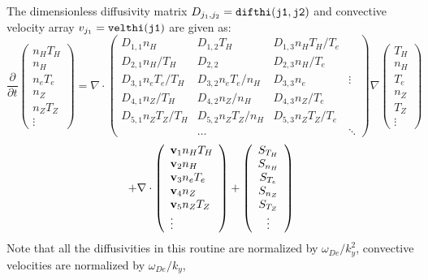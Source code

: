 The dimensionless diffusivity matrix $ D_{j_1,j_2} = {\tt difthi(j1,j2)}$
and convective velocity array $ v_{j_1} = {\tt velthi(j1)} $
are given as:
$$ \frac{\partial}{\partial t}
 \left( \begin{array}{c} n_H T_H  \\ n_H \\ n_e T_e \\
    n_Z \\ n_Z T_Z \\ \vdots
    \end{array} \right)
 = \nabla \cdot
\left( \begin{array}{llll}
D_{1,1} n_H & D_{1,2} T_H & D_{1,3} n_H T_H / T_e \\
D_{2,1} n_H / T_H & D_{2,2} & D_{2,3} n_H / T_e \\
D_{3,1} n_e T_e / T_H & D_{3,2} n_e T_e / n_H & D_{3,3} n_e & \vdots \\
D_{4,1} n_Z / T_H & D_{4,2} n_Z / n_H & D_{4,3} n_Z / T_e \\
D_{5,1} n_Z T_Z / T_H & D_{5,2} n_Z T_Z / n_H &
        D_{5,3} n_Z T_Z / T_e \\
 & \ldots & & \ddots
\end{array} \right)
 \nabla
 \left( \begin{array}{c}  T_H \\ n_H \\  T_e \\
   n_Z \\  T_Z \\ \vdots
    \end{array} \right)
$$
$$
 + \nabla \cdot
\left( \begin{array}{l} {\bf v}_1 n_H T_H \\ {\bf v}_2 n_H \\
   {\bf v}_3 n_e T_e \\
   {\bf v}_4 n_Z \\ {\bf v}_5 n_Z T_Z \\ \vdots \end{array} \right) +
 \left( \begin{array}{c} S_{T_H} \\ S_{n_H} \\ S_{T_e} \\
    S_{n_Z} \\ S_{T_Z} \\ \vdots
    \end{array} \right) $$
Note that all the diffusivities in this routine are normalized by
$ \omega_{De} / k_y^2 $,
convective velocities are normalized by $ \omega_{De} / k_y $,
